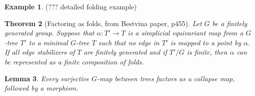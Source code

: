 \documentclass[12pt,parskip=full]{report}
\theoremstyle{plain}
\newtheorem{thm}{Theorem}[section]
\newtheorem{lem}[thm]{Lemma}
\theoremstyle{definition}
\newtheorem{exa}[thm]{Example}
\begin{document}
\begin{exa}
\label{exa:folding}
(??? detailed folding example)
\end{exa}

\begin{thm}[Factoring as folds, from Bestvina paper, p455]
    \label{thm:folds} 
    Let $G$ be a finitely generated group. Suppose that $\alpha: T'\to T$ is a simplicial equivariant map from a $G$-tree $T'$ to a minimal $G$-tree $T$ such that no edge in $T'$ is mapped to a point by $\alpha$. If all edge stabilizers of $T$ are finitely generated and if $T'/G$ is finite, then $\alpha$ can be represented as a finite composition of folds.
\end{thm}


\begin{lem}
    \label{lem:gmapfactor}
    Every surjective \(G\)-map between trees factors as a collapse map, followed by a morphism.
\end{lem}
\end{document}
